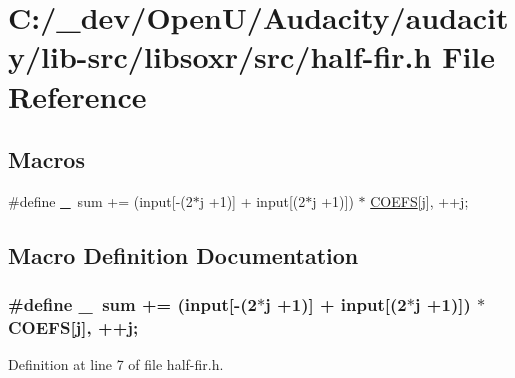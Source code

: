 \hypertarget{half-fir_8h}{}\section{C\+:/\+\_\+dev/\+Open\+U/\+Audacity/audacity/lib-\/src/libsoxr/src/half-\/fir.h File Reference}
\label{half-fir_8h}
\subsection*{Macros}
\begin{DoxyCompactItemize}
\item 
\#define \hyperlink{half-fir_8h_ae4dfd7b0d66121016d6466d2ff10e8ba}{\+\_\+}~sum += (input\mbox{[}-\/(2$\ast$j +1)\mbox{]} + input\mbox{[}(2$\ast$j +1)\mbox{]}) $\ast$ \hyperlink{filters_8h_a8c9f3dadacc1bbf38acc002e8e9b0e2c}{C\+O\+E\+FS}\mbox{[}j\mbox{]}, ++j;
\end{DoxyCompactItemize}


\subsection{Macro Definition Documentation}
\subsubsection[{\texorpdfstring{\+\_\+}{_}}]{\setlength{\rightskip}{0pt plus 5cm}\#define \+\_\+~sum += (input\mbox{[}-\/(2$\ast$j +1)\mbox{]} + input\mbox{[}(2$\ast$j +1)\mbox{]}) $\ast$ {\bf C\+O\+E\+FS}\mbox{[}j\mbox{]}, ++j;}\hypertarget{half-fir_8h_ae4dfd7b0d66121016d6466d2ff10e8ba}{}\label{half-fir_8h_ae4dfd7b0d66121016d6466d2ff10e8ba}


Definition at line 7 of file half-\/fir.\+h.

